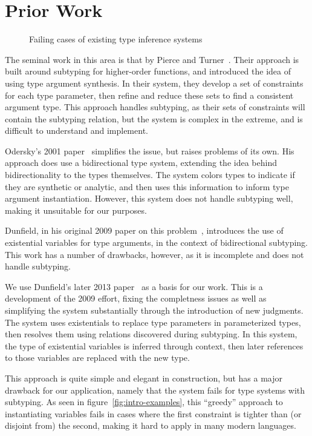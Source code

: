 \documentclass{llncs}
\begin{document}
\section{Prior Work}

\begin{figure}

\label{fig:cons}
\caption{Failing cases of existing type inference systems}
\end{figure}

The seminal work in this area is that by Pierce and Turner~\cite{Pierce:2000:LTI:345099.345100}. Their approach is built around subtyping for higher-order functions, and introduced the idea of using type argument synthesis. In their system, they develop a set of constraints for each type parameter, then refine and reduce these sets to find a consistent argument type. This approach handles subtyping, as their sets of constraints will contain the subtyping relation, but the system is complex in the extreme, and is difficult to understand and implement.

Odersky's 2001 paper~\cite{odersky2001colored} simplifies the issue, but raises problems of its own. His approach does use a bidirectional type system, extending the idea behind bidirectionality to the types themselves. The system colors types to indicate if they are synthetic or analytic, and then uses this information to inform type argument instantiation. However, this system does not handle subtyping well, making it unsuitable for our purposes.

Dunfield, in his original 2009 paper on this problem~\cite{Dunfield09:polymorphism}, introduces the use of existential variables for type arguments, in the context of bidirectional subtyping. This work has a number of drawbacks, however, as it is incomplete and does not handle subtyping.

We use Dunfield's later 2013 paper~\cite{Dunfield:2013:CEB:2544174.2500582} as a basis for our work. This is a development of the 2009 effort, fixing the completness issues as well as simplifying the system substantially through the introduction of new judgments. The system uses existentials to replace type parameters in parameterized types, then resolves them using relations discovered during subtyping. In this system, the type of existential variables is inferred through context, then later references to those variables are replaced with the new type.

This approach is quite simple and elegant in construction, but has a major drawback for our application, namely that the system fails for type systems with subtyping. As seen in figure~\ref{fig:intro-examples}, this ``greedy'' approach to instantiating variables fails in cases where the first constraint is tighter than (or disjoint from) the second, making it hard to apply in many modern languages. 
\end{document}

